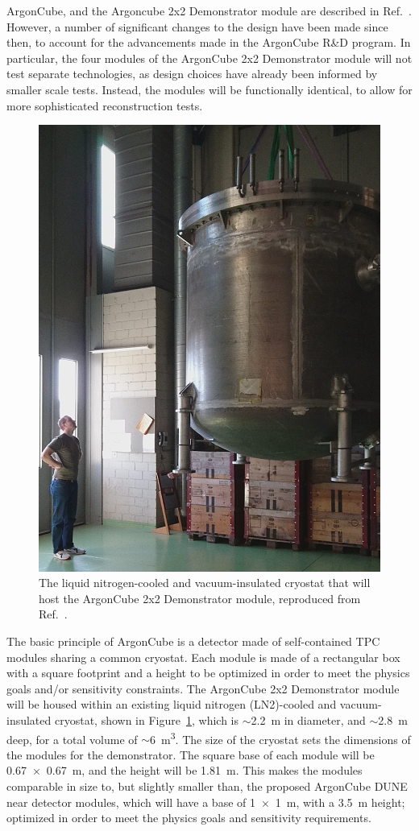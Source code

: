 ArgonCube, and the Argoncube 2x2 Demonstrator module are described in Ref.~\cite{argoncube_loi}. However, a number of significant changes to the design have been made since then, to account for the advancements made in the ArgonCube R\&D program. In particular, the four modules of the ArgonCube 2x2 Demonstrator module will not test separate technologies, as design choices have already been informed by smaller scale tests. Instead, the modules will be functionally identical, to allow for more sophisticated reconstruction tests.

\begin{figure}[htbp]
\centering
\includegraphics[width=0.45\linewidth]{plots/cryostat}
\caption{The liquid nitrogen-cooled and vacuum-insulated cryostat that will host the ArgonCube 2x2 Demonstrator module, reproduced from Ref.~\cite{argoncube_loi}.}
\label{fig:2x2_cryostat}
\end{figure}

The basic principle of ArgonCube is a detector made of self-contained TPC modules sharing a common cryostat. Each module is made of a rectangular box with a square footprint and a height to be optimized in order to meet the physics goals and/or sensitivity constraints. The ArgonCube 2x2 Demonstrator module will be housed within an existing liquid nitrogen (LN2)-cooled and vacuum-insulated cryostat, shown in Figure~\ref{fig:2x2_cryostat}, which is $\sim$\SI{2.2}{\metre} in diameter, and $\sim$\SI{2.8}{\metre} deep, for a total volume of $\sim$\SI{6}{\metre\cubed}. The size of the cryostat sets the dimensions of the modules for the demonstrator. The square base of each module will be \SI{0.67 x 0.67}{\metre}, and the height will be \SI{1.81}{\metre}. This makes the modules comparable in size to, but slightly smaller than, the proposed ArgonCube DUNE near detector modules, which will have a base of \SI{1 x 1}{\metre}, with a \SI{3.5}{\metre} height; optimized in order to meet the physics goals and sensitivity requirements.


